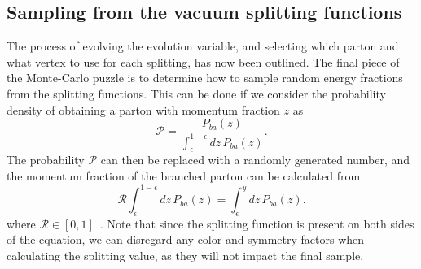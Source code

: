 \documentclass[main.tex]{subfiles}
\begin{document}
\subsection{Sampling from the vacuum splitting functions}\label{sec: metropolis_hastings}
The process of evolving the evolution variable, and selecting which parton and what vertex to use for each splitting, has now been outlined. The final piece of the Monte-Carlo puzzle is to determine how to sample random energy fractions from the splitting functions. This can be done if we consider the probability density of obtaining a parton with momentum fraction \(z\) as
\begin{equation}\label{eqn: probability_density_for_splitting}
    \mathcal{P}= \frac{ P_{ba}(z)}{\int_\epsilon^{1-\epsilon} dz \, P_{ba}(z)}.
\end{equation}
The probability \(\mathcal{P}\) can then be replaced with a randomly generated number, and the momentum fraction of the branched parton can be calculated from
\begin{equation}\label{eqn: energyfraction_function_R}
    \mathcal{R} \int_\epsilon^{1-\epsilon} dz \, P_{ba}(z) = \int_\epsilon^{y}dz \, P_{ba}(z).
\end{equation}
where \(\mathcal{R}\in [0,1]\)~\cite{ellis_stirling_webber_1996}. Note that since the splitting function is present on both sides of the equation, we can disregard any color and symmetry factors when calculating the splitting value, as they will not impact the final sample.
\end{document}
